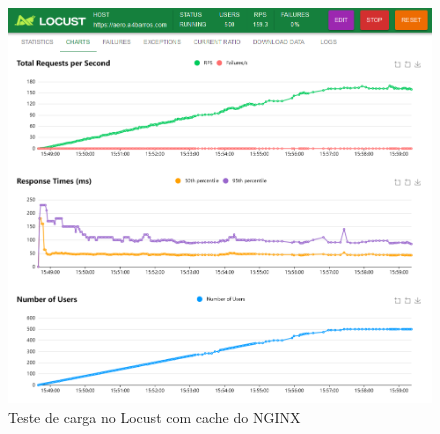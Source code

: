 \begin{figure}[ht]
    \begin{center}
    \includegraphics[width=400pt]{img/locust-cache.png}
    \caption{Teste de carga no Locust com cache do NGINX}
    \label{fig:locust-cache}
    \end{center}
\end{figure}